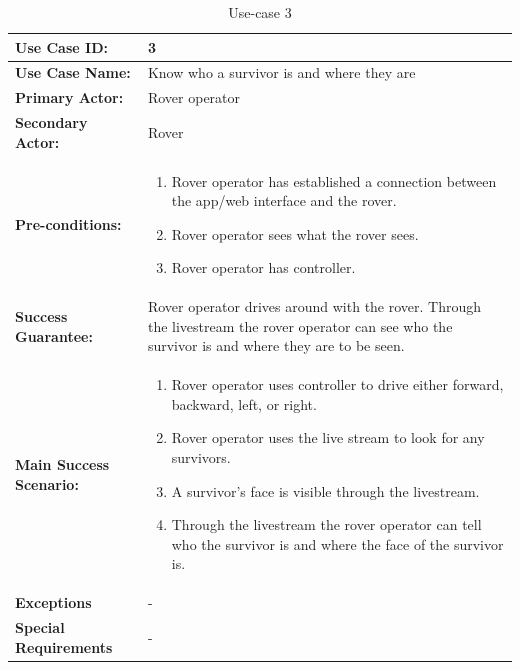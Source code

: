 \documentclass[12pt]{article}
\begin{document}
	 	\begin{table}[H]
	 		\centering
	 		\begin{tabularx}{\linewidth}{|X|X|}
	 			\hline
	 			\textbf{Use Case ID:} &3\\
	 			\hline
	 			\textbf{Use Case Name:} &Know who a survivor is and where they are\\
	 			\hline
	 			\textbf{Primary Actor:} &Rover operator\\
	 			\hline
	 			\textbf{Secondary Actor:} &Rover\\
	 			\hline
	 			\textbf{Pre-conditions:} &\begin{enumerate}
	 				\item Rover operator has established a connection between the app/web interface and the rover.
	 				\item Rover operator sees what the rover sees.
	 				\item Rover operator has controller.
	 			\end{enumerate}\\
	 			\hline
	 			\textbf{Success Guarantee:} &Rover operator drives around with the rover. Through the livestream the rover operator can see who the survivor is and where they are to be seen. \\
	 			\hline 
	 			\textbf{Main Success Scenario:} &\begin{enumerate}
	 				\item Rover operator uses controller to drive either forward, backward, left, or right.
	 				\item Rover operator uses the live stream to look for any survivors.
	 				\item A survivor’s face is visible through the livestream.
	 				\item Through the livestream the rover operator can tell who the survivor is and where the face of the survivor is.
	 			\end{enumerate}\\
	 			\hline
	 			\textbf{Exceptions} &-\\
	 			\hline
	 			\textbf{Special Requirements} &-\\
	 			\hline
	 		\end{tabularx}
	 		\caption{Use-case 3}
	 		\label{table:Use-case3}   
	 	\end{table}
\end{document}
